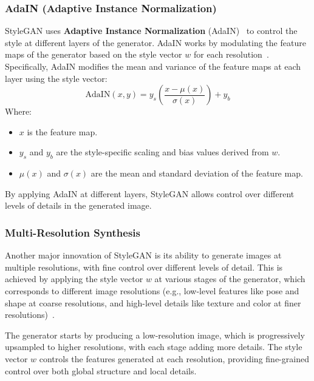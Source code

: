 \subsubsection{AdaIN (Adaptive Instance Normalization)}
StyleGAN uses \textbf{Adaptive Instance Normalization} (AdaIN)~\cite{huang2017arbitrary} to control the style at different layers of the generator. AdaIN works by modulating the feature maps of the generator based on the style vector \( w \) for each resolution~\cite{kim2020transfer}. Specifically, AdaIN modifies the mean and variance of the feature maps at each layer using the style vector:
\[
\text{AdaIN}(x, y) = y_s \left( \frac{x - \mu(x)}{\sigma(x)} \right) + y_b
\]
Where:
\begin{itemize}
    \item \( x \) is the feature map.
    \item \( y_s \) and \( y_b \) are the style-specific scaling and bias values derived from \( w \).
    \item \( \mu(x) \) and \( \sigma(x) \) are the mean and standard deviation of the feature map.
\end{itemize}
By applying AdaIN at different layers, StyleGAN allows control over different levels of details in the generated image.

\subsubsection{Multi-Resolution Synthesis}
Another major innovation of StyleGAN is its ability to generate images at multiple resolutions, with fine control over different levels of detail. This is achieved by applying the style vector \( w \) at various stages of the generator, which corresponds to different image resolutions (e.g., low-level features like pose and shape at coarse resolutions, and high-level details like texture and color at finer resolutions)~\cite{jing2020dynamic}.

The generator starts by producing a low-resolution image, which is progressively upsampled to higher resolutions, with each stage adding more details. The style vector \( w \) controls the features generated at each resolution, providing fine-grained control over both global structure and local details.

